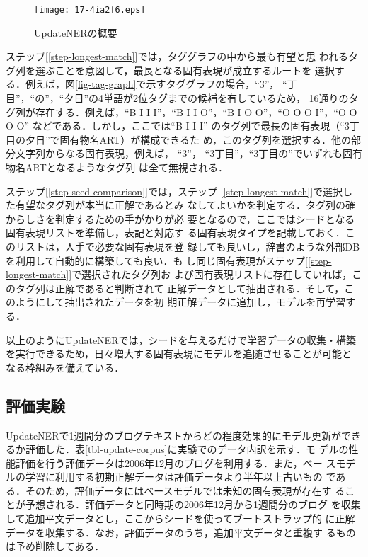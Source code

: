 \documentclass[japanese]{jnlp_1.4}
\begin{document}
\begin{figure}[t]
\begin{center}
\texttt{[image: 17-4ia2f6.eps]}
\end{center}
\caption{UpdateNERの概要}
\label{fig-update-ner}
\end{figure}


ステップ[\ref{step-longest-match}]では，タググラフの中から最も有望と思
われるタグ列を選ぶことを意図して，最長となる固有表現が成立するルートを
選択する．例えば，図\ref{fig-tag-graph}で示すタググラフの場合，``3''，
``丁目''，``の''，``夕日''の4単語が2位タグまでの候補を有しているため，
16通りのタグ列が存在する．例えば，``B I I I''，``B I I O''，``B I O
O''，``O O O I''，``O O O O'' などである．しかし，ここでは``B I I I''
のタグ列で最長の固有表現（``3丁目の夕日''で固有物名ART）が構成できるた
め，このタグ列を選択する．他の部分文字列からなる固有表現，例えば，
``3''， ``3丁目''，``3丁目の''でいずれも固有物名ARTとなるようなタグ列
は全て無視される．

ステップ[\ref{step-seed-comparison}]では，ステップ
[\ref{step-longest-match}]で選択した有望なタグ列が本当に正解であるとみ
なしてよいかを判定する．タグ列の確からしさを判定するための手がかりが必
要となるので，ここではシードとなる固有表現リストを準備し，表記と対応す
る固有表現タイプを記載しておく．このリストは，人手で必要な固有表現を登
録しても良いし，辞書のような外部DBを利用して自動的に構築しても良い．も
し同じ固有表現がステップ[\ref{step-longest-match}]で選択されたタグ列お
よび固有表現リストに存在していれば，このタグ列は正解であると判断されて
正解データとして抽出される．そして，このようにして抽出されたデータを初
期正解データに追加し，モデルを再学習する．

以上のようにUpdateNERでは，シードを与えるだけで学習データの収集・構築
を実行できるため，日々増大する固有表現にモデルを追随させることが可能と
なる枠組みを備えている．


\subsection{評価実験}

UpdateNERで1週間分のブログテキストからどの程度効果的にモデル更新ができ
るか評価した．表\ref{tbl-update-corpus}に実験でのデータ内訳を示す．モ
デルの性能評価を行う評価データは2006年12月のブログを利用する．また，ベー
スモデルの学習に利用する初期正解データは評価データより半年以上古いもの
である．そのため，評価データにはベースモデルでは未知の固有表現が存在す
ることが予想される．評価データと同時期の2006年12月から1週間分のブログ
を収集して追加平文データとし，ここからシードを使ってブートストラップ的
に正解データを収集する．なお，評価データのうち，追加平文データと重複す
るものは予め削除してある．
\end{document}
